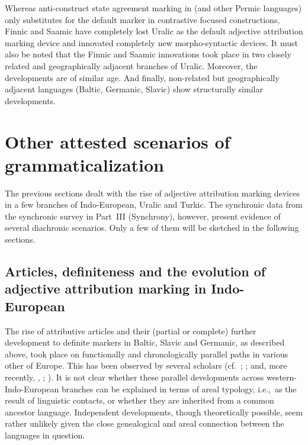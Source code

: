 {Whereas anti\hyp{}construct state agreement marking in  (and other Permic languages) only substitutes for the default marker in contrastive focused constructions, Finnic and Saamic have completely lost Uralic  as the default adjective attribution marking device and innovated completely new morpho-syntactic devices. It must also be noted that the Finnic and Saamic innovations took place in two closely related and geographically adjacent branches of Uralic. Moreover, the developments are of similar age. And finally, non-related but geographically adjacent languages (Baltic, Germanic, Slavic) show structurally similar developments.

\section{Other attested scenarios of grammaticalization}
The previous sections dealt with the rise of adjective attribution marking devices in a few branches of Indo-European, Uralic and Turkic. The synchronic data from the synchronic survey in Part~III (Synchrony), however, present evidence of several diachronic scenarios. Only a few of them will be sketched in the following sections.

\subsection[Articles, definiteness and adjective attribution]{Articles, definiteness and the evolution of adjective attribution marking in Indo-European}
The rise of attributive articles and their (partial or complete) further development to definite markers in Baltic, Slavic and Germanic, as described above, took place on functionally and chronologically parallel paths in various other  of Europe. This has been observed by several scholars (cf.~\citealt{brugmann-etal1916}; \citealt{gamillscheg1937}; \citealt{heinrichs1954} and, more recently, \citealt{nocentini1996}, \citealt{philippi1997}; \citealt{himmelmann1997}). It is not clear whether these parallel developments across western-Indo-European branches can be explained in terms of areal typology, i.e.,~as the result of linguistic contacts, or whether they are inherited from a common ancestor language. Independent developments, though theoretically possible, seem rather unlikely given the close genealogical and areal connection between the languages in question.

}
